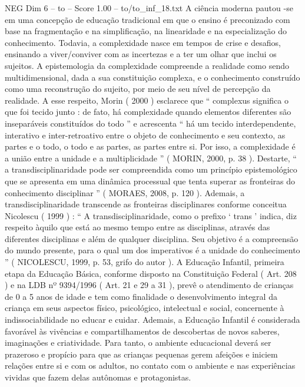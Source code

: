 \begin{textsample}{NEG Dim 6 – to – Score 1.00 – to/to\_inf\_18.txt}  \label{ex:f6_neg_115}
A ciência moderna pautou -se em uma concepção de educação tradicional em que o ensino é preconizado com base na fragmentação e na simplificação, na linearidade e na especialização do conhecimento.
Todavia, a complexidade nasce em tempos de crise e desafios, ensinando a viver/conviver com as incertezas e a ter um olhar que inclui os sujeitos.
A epistemologia da complexidade compreende a realidade como sendo multidimensional, dada a sua constituição complexa, e o conhecimento construído como uma reconstrução do sujeito, por meio de seu nível de percepção da realidade.
A esse respeito, Morin ( 2000 ) esclarece que “ complexus significa o que foi tecido junto : de fato, há complexidade quando elementos diferentes são inseparáveis constituídos do todo ” e acrescenta “ há um tecido interdependente, interativo e inter-retroativo entre o objeto de conhecimento e seu contexto, as partes e o todo, o todo e as partes, as partes entre si.
Por isso, a complexidade é a união entre a unidade e a multiplicidade ” ( MORIN, 2000, p. 38 ).
Destarte, “ a transdisciplinaridade pode ser compreendida como um princípio epistemológico que se apresenta em uma dinâmica processual que tenta superar as fronteiras do conhecimento disciplinar ” ( MORAES, 2008, p. 120 ).
Ademais, a transdisciplinaridade transcende as fronteiras disciplinares conforme conceitua Nicolescu ( 1999 ) : “ A transdisciplinaridade, como o prefixo ‘ trans ’ indica, diz respeito àquilo que está ao mesmo tempo entre as disciplinas, através das diferentes disciplinas e além de qualquer disciplina.
Seu objetivo é a compreensão do mundo presente, para o qual um dos imperativos é a unidade do conhecimento ” ( NICOLESCU, 1999, p. 53, grifo do autor ).
A Educação Infantil, primeira etapa da Educação Básica, conforme disposto na Constituição Federal ( Art. 208 ) e na LDB nº 9394/1996 ( Art. 21 e 29 a 31 ), prevê o atendimento de crianças de 0 a 5 anos de idade e tem como finalidade o desenvolvimento integral da criança em seus aspectos físico, psicológico, intelectual e social, concernente à indissociabilidade no educar e cuidar.
Ademais, a Educação Infantil é considerada favorável às vivências e compartilhamentos de descobertas de novos saberes, imaginações e criatividade.
Para tanto, o ambiente educacional deverá ser prazeroso e propício para que as crianças pequenas gerem afeições e iniciem relações entre si e com os adultos, no contato com o ambiente e nas experiências vividas que fazem delas autônomas e protagonistas.

\end{textsample}
